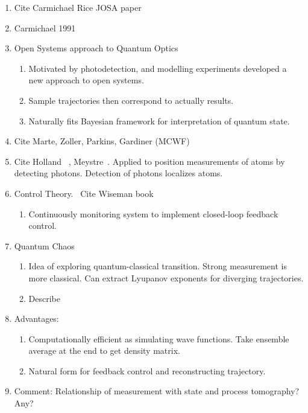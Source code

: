 \begin{enumerate}
\item Cite Carmichael Rice JOSA paper~\cite{Carmichael1989}
\item Carmichael 1991 ~\cite{Carmichael1991}
\item Open Systems approach to Quantum Optics\cite{Carmichael1993}
\begin{enumerate}
\item Motivated by photodetection, and modelling experiments developed a new approach to open systems.  
\item Sample trajectories then correspond to actually results.
\item Naturally fits Bayesian framework for interpretation of quantum state.  
\end{enumerate}
\item Cite Marte, Zoller, Parkins, Gardiner (MCWF)  \cite{Dalibard1992,Dum1992,Gardiner1992}

\item Cite Holland ~\cite{Holland1996}, Meystre~\cite{Greenwood1997}.
  Applied to position measurements of atoms by detecting photons.
  Detection of photons localizes atoms.  
\item Control Theory.~\cite{Wiseman1993}  Cite Wiseman book
\begin{enumerate}
  \item Continuously monitoring system to implement closed-loop feedback control.  
\end{enumerate}
\item Quantum Chaos
\begin{enumerate}
  \item Idea of exploring quantum-classical transition.
  Strong measurement is more classical.
  Can extract Lyupanov exponents for diverging trajectories.
  \cite{Bhattacharya2000,Habib2002,Habib2006}
  \cite{Scott2001}
  \item Describe 
\end{enumerate}
\item Advantages:
\begin{enumerate}
  \item Computationally efficient as simulating wave functions.
  Take ensemble average at the end to get density matrix.  
  \item Natural form for feedback control and reconstructing trajectory.  
\end{enumerate}
\item Comment: Relationship of measurement with state and process tomography?  Any?  


\end{enumerate}
